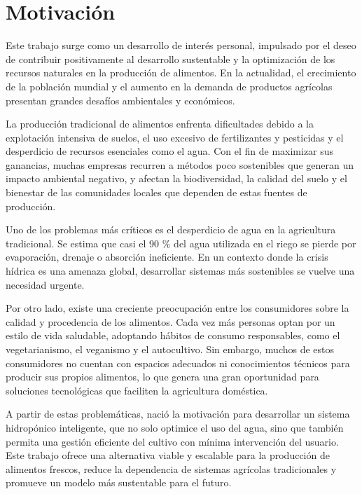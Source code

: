 
\section{Motivación}

Este trabajo surge como un desarrollo de interés personal, impulsado por el deseo de contribuir positivamente al desarrollo sustentable y la optimización de los recursos naturales en la producción de alimentos. En la actualidad, el crecimiento de la población mundial y el aumento en la demanda de productos agrícolas presentan grandes desafíos ambientales y económicos.

La producción tradicional de alimentos enfrenta dificultades debido a la explotación intensiva de suelos, el uso excesivo de fertilizantes y pesticidas y el desperdicio de recursos esenciales como el agua. Con el fin de maximizar sus ganancias, muchas empresas recurren a métodos poco sostenibles que generan un impacto ambiental negativo, y afectan la biodiversidad, la calidad del suelo y el bienestar de las comunidades locales que dependen de estas fuentes de producción.

Uno de los problemas más críticos es el desperdicio de agua en la agricultura tradicional. Se estima que casi el 90 \% del agua utilizada en el riego se pierde por evaporación, drenaje o absorción ineficiente. En un contexto donde la crisis hídrica es una amenaza global, desarrollar sistemas más sostenibles se vuelve una necesidad urgente.

Por otro lado, existe una creciente preocupación entre los consumidores sobre la calidad y procedencia de los alimentos. Cada vez más personas optan por un estilo de vida saludable, adoptando hábitos de consumo responsables, como el vegetarianismo, el veganismo y el autocultivo. Sin embargo, muchos de estos consumidores no cuentan con espacios adecuados ni conocimientos técnicos para producir sus propios alimentos, lo que genera una gran oportunidad para soluciones tecnológicas que faciliten la agricultura doméstica.

A partir de estas problemáticas, nació la motivación para desarrollar un sistema hidropónico inteligente, que no solo optimice el uso del agua, sino que también permita una gestión eficiente del cultivo con mínima intervención del usuario. Este trabajo ofrece una alternativa viable y escalable para la producción de alimentos frescos, reduce la dependencia de sistemas agrícolas tradicionales y promueve un modelo más sustentable para el futuro.


